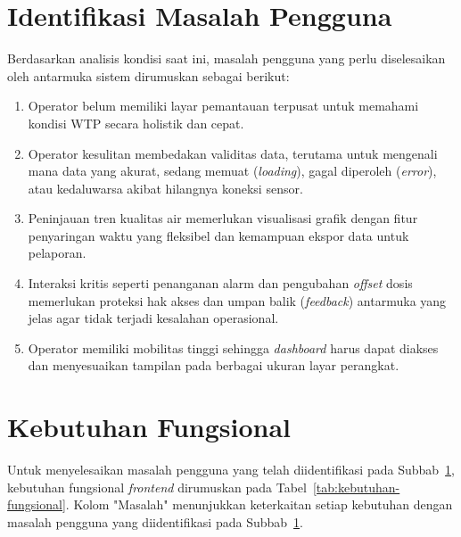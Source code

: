 \section{Identifikasi Masalah Pengguna}
\label{sec:masalah-pengguna}
Berdasarkan analisis kondisi saat ini, masalah pengguna yang perlu diselesaikan
oleh antarmuka sistem dirumuskan sebagai berikut:
\begin{enumerate}
    \item Operator belum memiliki layar pemantauan terpusat untuk memahami 
    kondisi WTP secara holistik dan cepat.
    \item Operator kesulitan membedakan validitas data, terutama untuk mengenali 
    mana data yang akurat, sedang memuat (\textit{loading}), gagal diperoleh 
    (\textit{error}), atau kedaluwarsa akibat hilangnya koneksi sensor.
    \item Peninjauan tren kualitas air memerlukan visualisasi grafik dengan fitur 
    penyaringan waktu yang fleksibel dan kemampuan ekspor data untuk pelaporan.
    \item Interaksi kritis seperti penanganan alarm dan pengubahan \textit{offset} dosis 
    memerlukan proteksi hak akses dan umpan balik (\textit{feedback}) antarmuka yang jelas 
    agar tidak terjadi kesalahan operasional.
    \item Operator memiliki mobilitas tinggi sehingga \textit{dashboard} harus 
    dapat diakses dan menyesuaikan tampilan pada berbagai ukuran layar perangkat.
\end{enumerate}

\section{Kebutuhan Fungsional}
\label{sec:kebutuhan-fungsional}
Untuk menyelesaikan masalah pengguna yang telah diidentifikasi pada
Subbab~\ref{sec:masalah-pengguna}, kebutuhan fungsional \textit{frontend} dirumuskan pada
Tabel~\ref{tab:kebutuhan-fungsional}. Kolom "Masalah" menunjukkan
keterkaitan setiap kebutuhan dengan masalah pengguna yang diidentifikasi
pada Subbab~\ref{sec:masalah-pengguna}.


